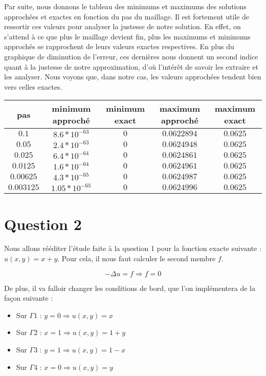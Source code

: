 \documentclass[11pt,a4paper]{report}
\begin{document}
			Par suite, nous donnons le tableau des minimums et maximums des solutions approchées et exactes en fonction du pas du maillage. Il est fortement utile de ressortir ces valeurs pour analyser la justesse de notre solution. En effet, on s'attend à ce que plus le maillage devient fin, plus les maximums et minimums approchés se rapprochent de leurs valeurs exactes respectives. En plus du graphique de diminution de l'erreur, ces dernières nous donnent un second indice quant à la justesse de notre approximation, d'où l'intérêt de savoir les extraire et les analyser. Nous voyons que, dans notre cas, les valeurs approchées tendent bien vers celles exactes.		
		
			\begin{center}
				\begin{tabular}{|c|c|c|c|c|}
					\hline
					pas & minimum approché & minimum exact & maximum approché & maximum exact \\
					\hline 
					$0.1$ & $8.6*10^{-63}$ & $0$ & $0.0622894$ & $0.0625$\\ 
					\hline 
					$0.05$ & $2.4*10^{-63}$ & $0$ & $0.0624948$ & $0.0625$\\ 
					\hline 
					$0.025$ & $6.4*10^{-64}$ & $0$ & $0.0624861$ & $0.0625$  \\ 
					\hline 
					$0.0125$ & $1.6*10^{-64}$ & $0$ & $0.0624961$ & $0.0625$\\ 
					\hline 
					$0.00625$ & $4.3*10^{-65}$ & $0$ & $0.0624987$ & $0.0625$ \\ 
					\hline 
					$0.003125$ & $1.05*10^{-65}$ & $0$ & $0.0624996$ & $0.0625$ \\ 
					\hline 
				\end{tabular} 
			\end{center}
			
		
		\section*{Question 2}
		
			Nous allons rééditer l'étude faite à la question 1 pour la fonction exacte suivante : $ u(x,y) = x + y$. Pour cela, il nous faut calculer le second membre $f$. 
			
			\[
			- \Delta u = f \Longrightarrow f = 0 
			\]
			
			De plus, il va falloir changer les conditions de bord, que l'on implémentera de la façon suivante : 
			
			\begin{itemize}
				\item Sur $ \Gamma 1 $ : $ y = 0 \Longrightarrow u(x,y) = x$ 
				\item Sur $ \Gamma 2 $ : $ x = 1 \Longrightarrow u(x,y) = 1 + y $
				\item Sur $ \Gamma 3 $ : $ y = 1 \Longrightarrow u(x,y) = 1 - x$
				\item Sur $ \Gamma 4 $ : $ x = 0 \Longrightarrow u(x,y) = y$
				 
			\end{itemize}
			
\end{document}

